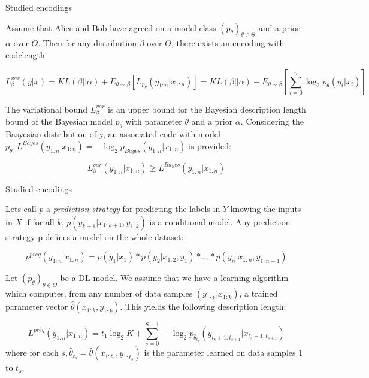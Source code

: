 \documentclass[10pt, handout, envcountsect]{beamer} %
\begin{document}

\begin{frame}{Studied encodings}

\begin{definition}
Assume that Alice and Bob have agreed on a model class $(p_{\theta})_{\theta \in \Theta}$ and a prior $\alpha$ over $\Theta$. Then for any distribution $\beta$ over $\Theta$, there exists an encoding with codelength

$$
L^{var}_{\beta}(y|x) = KL(\beta||\alpha) + E_{\theta\sim\beta}[L_{p_{\theta}}(y_{1:n}|x_{1:n})] = KL(\beta||\alpha) - E_{\theta\sim\beta}[\sum_{i=0}^{n}\log_{2}p_{\theta}(y_{i}|x_{i})]
$$

The variational bound $L^{var}_{\beta}$ is an upper bound for the Bayesian description length bound of the Bayesian model $p_{\theta}$ with parameter $\theta$ and a prior $\alpha$. Considering the Basyesian distribution of y, an associated code with model $p_{\theta}: L^{Bayes}(y_{1:n}|x_{1:n}) = -\log_{2}p_{Bayes}(y_{1:n}|x_{1:n})$ is provided:

$$
L_{\beta}^{var}(y_{1:n}|x_{1:n}) \ge L^{Bayes}(y_{1:n}|x_{1:n})
$$
    
\end{definition}
    
\end{frame}


\begin{frame}{Studied encodings}

\begin{definition}
Lets call $p$ a \emph{prediction strategy} for predicting the labels in $Y$ knowing the inputs in $X$ if for all $k$, $p(y_{k+1}|x_{1:k+1}, y_{1:k})$ is a conditional model. Any prediction strategy p defines a model on the whole dataset:

$$
p^{preq}(y_{1:n}|x_{1:n}) = p(y_1|x_1) * p(y_2|x_{1:2}, y_1) * ... * p(y_n|x_{1:n}, y_{1:n-1})
$$

Let $(p_{\theta})_{\theta \in \Theta}$ be a DL model. We assume that we have a learning algorithm which computes, from any number of data samples $(y_{1:k}|x_{1:k})$, a trained parameter vector $\hat{\theta}(x_{1:k}, y_{1:k})$. This yields the following description length:

$$
L^{preq}(y_{1:n}|x_{1:n}) = t_1\log_{2}K + \sum_{s=0}^{S-1} - \log_{2}p_{\hat{\theta}_{t_s}}(y_{t_s+1:t_{s+1}}|x_{t_s+1:t_{s+1}})
$$
where for each $s, \hat{\theta}_{t_s} = \hat{\theta}(x_{1:t_s}, y_{1:t_s})$ is the parameter learned on data samples 1 to $t_s$.
    
\end{definition}
    
\end{frame}
\end{document}
